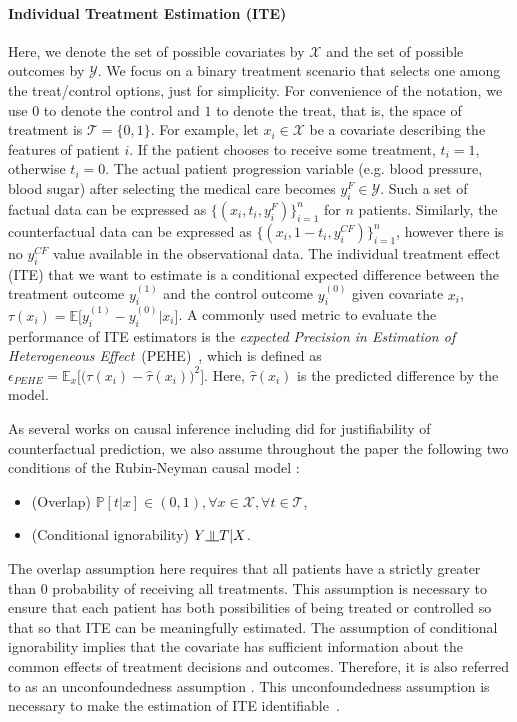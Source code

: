 \documentclass{article}
\newcommand{\indep}{\rotatebox[origin=c]{90}{$\models$}}
\begin{document}
\paragraph{Individual Treatment Estimation (ITE)}
Here, we denote the set of possible covariates by $\mathcal{X}$ and the set of possible outcomes by $\mathcal{Y}$. We focus on a binary treatment scenario that selects one among the treat/control options, just for simplicity.
For convenience of the notation, we use $0$ to denote the control and $1$ to denote the treat, that is, the space of treatment is $\mathcal{T} = \{0,1\}$. For example, let $x_i \in \mathcal{X}$ be a covariate describing the features of patient $i$. If the patient chooses to receive some treatment, $t_i = 1$, otherwise $t_i = 0$. The actual patient progression variable (e.g. blood pressure, blood sugar) after selecting the medical care becomes $y_i^{F} \in \mathcal{Y}$. Such a set of factual data can be expressed as $\{(x_i, t_i, y_i ^ F)\}_{i = 1}^{n}$ for $n$ patients. Similarly, the counterfactual data can be expressed as $\{(x_i, 1- t_i, y_i^{CF})\}_ {i = 1}^{n}$, however there is no $ y_i^{CF}$ value available in the observational data. The individual treatment effect (ITE) that we want to estimate is a conditional expected difference between the treatment outcome $ y_i^{(1)} $ and the control outcome $ y_i^{(0)} $ given covariate $ x_i $,
$\tau(x_i) = \mathbb{E}\big[ y_i^{(1)} - y_i^{(0)} | x_i \big]$.
A commonly used metric to evaluate the performance of ITE estimators is the \textit{expected Precision in Estimation of Heterogeneous Effect}~(PEHE)~\cite{hill2011bayesian}, which is defined as 
$\epsilon_{PEHE} = \mathbb{E}_{x}\big[\big(\tau(x_i) - \hat{\tau}(x_i)\big)^2\big]$. Here,  $\hat{\tau}(x_i)$ is the predicted difference by the model. 


As several works on causal inference including \cite{johansson16, Shalit17, yao2018} did for justifiability of counterfactual prediction, we also assume throughout the paper the following two conditions of the Rubin-Neyman causal model \cite{Rubin1974, Shalit17}:
    \begin{itemize}
        \item (Overlap) $\mathbb{P}[t|x] \in (0,1) ,\forall x \in \mathcal{X}, \forall t \in \mathcal{T}$,
        \item (Conditional ignorability) $Y \indep T | X$.
    \end{itemize}
    The overlap assumption here requires that all patients have a strictly greater than $0$ probability of receiving all treatments. This assumption is necessary to ensure that each patient has both possibilities of being treated or controlled so that so that ITE can be meaningfully estimated. The assumption of conditional ignorability implies that the covariate has sufficient information about the common effects of treatment decisions and outcomes. Therefore, it is also referred to as an unconfoundedness assumption \cite{Rubin2005}. This unconfoundedness assumption is necessary to make the estimation of ITE identifiable~\cite{Rubin15}.
    
\end{document}
